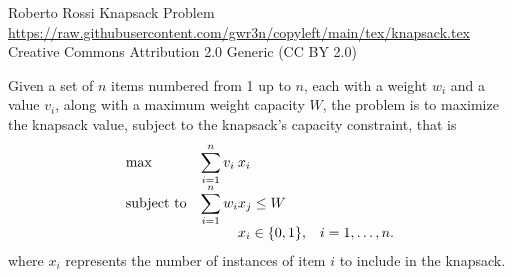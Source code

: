 \begin{copyleft}
{Roberto Rossi}                                                                %
{Knapsack Problem}                                                             %
{\url{https://raw.githubusercontent.com/gwr3n/copyleft/main/tex/knapsack.tex}} %
{Creative Commons Attribution 2.0 Generic (CC BY 2.0)}                         %

Given a set of $n$ items numbered from 1 up to $n$, 
each with a weight $w_i$ and a value $v_i$, 
along with a maximum weight capacity $W$, the problem 
is to maximize the knapsack value, subject to the 
knapsack's capacity constraint, that is 
\[
\begin{array}{ll@{}ll}
\mathrm{max}        & \displaystyle\sum\limits_{i=1}^{n} v_{i}&x_{i} &\\
\mathrm{subject~to} & \displaystyle\sum\limits_{i=1}^{n} w_{i}&x_{j} \leq W\\
                    &                                        
                    &x_{i} \in \{0,1\}, &i=1 ,\dots, n.
\end{array}
\]
where $x_{i}$ represents the number of instances of item $i$ 
to include in the knapsack.

\end{copyleft}